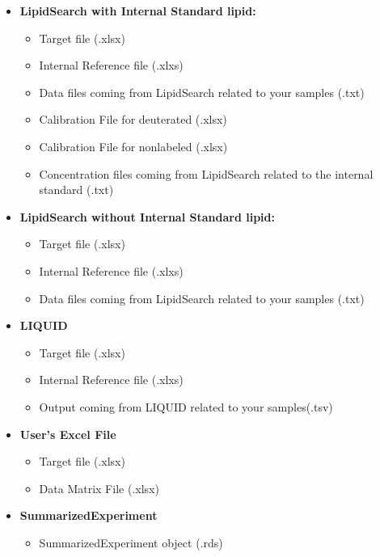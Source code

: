 \documentclass[
]{book}
\providecommand{\tightlist}{%
  \setlength{\itemsep}{0pt}\setlength{\parskip}{0pt}}
\begin{document}
\begin{itemize}
\tightlist
\item
  \textbf{LipidSearch with Internal Standard lipid:}

  \begin{itemize}
  \tightlist
  \item
    Target file (.xlsx)
  \item
    Internal Reference file (.xlxs)
  \item
    Data files coming from LipidSearch related to your samples (.txt)
  \item
    Calibration File for deuterated (.xlsx)
  \item
    Calibration File for nonlabeled (.xlsx)
  \item
    Concentration files coming from LipidSearch related to the internal standard (.txt)
  \end{itemize}
\item
  \textbf{LipidSearch without Internal Standard lipid:}

  \begin{itemize}
  \tightlist
  \item
    Target file (.xlsx)
  \item
    Internal Reference file (.xlxs)
  \item
    Data files coming from LipidSearch related to your samples (.txt)
  \end{itemize}
\item
  \textbf{LIQUID}

  \begin{itemize}
  \tightlist
  \item
    Target file (.xlsx)
  \item
    Internal Reference file (.xlxs)
  \item
    Output coming from LIQUID related to your samples(.tsv)
  \end{itemize}
\item
  \textbf{User's Excel File}

  \begin{itemize}
  \tightlist
  \item
    Target file (.xlsx)
  \item
    Data Matrix File (.xlsx)
  \end{itemize}
\item
  \textbf{SummarizedExperiment}

  \begin{itemize}
  \tightlist
  \item
    SummarizedExperiment object (.rds)
  \end{itemize}
\end{itemize}
\end{document}
